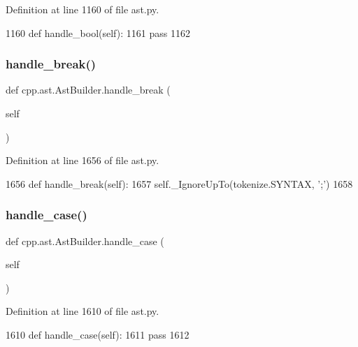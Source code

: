 Definition at line 1160 of file ast.\+py.


\begin{DoxyCode}
1160     \textcolor{keyword}{def }handle\_bool(self):
1161         \textcolor{keywordflow}{pass}
1162 
\end{DoxyCode}
\mbox{\label{classcpp_1_1ast_1_1AstBuilder_a2b663a3e15e70b9d85bf17afb2bcf07a}} 
\subsubsection{\texorpdfstring{handle\+\_\+break()}{handle\_break()}}
{\footnotesize\ttfamily def cpp.\+ast.\+Ast\+Builder.\+handle\+\_\+break (\begin{DoxyParamCaption}\item[{}]{self }\end{DoxyParamCaption})}



Definition at line 1656 of file ast.\+py.


\begin{DoxyCode}
1656     \textcolor{keyword}{def }handle\_break(self):
1657         self.\_IgnoreUpTo(tokenize.SYNTAX, \textcolor{stringliteral}{';'})
1658 
\end{DoxyCode}
\mbox{\label{classcpp_1_1ast_1_1AstBuilder_ac4f02e1ba7df670086e4c9dabdb21458}} 
\subsubsection{\texorpdfstring{handle\+\_\+case()}{handle\_case()}}
{\footnotesize\ttfamily def cpp.\+ast.\+Ast\+Builder.\+handle\+\_\+case (\begin{DoxyParamCaption}\item[{}]{self }\end{DoxyParamCaption})}



Definition at line 1610 of file ast.\+py.


\begin{DoxyCode}
1610     \textcolor{keyword}{def }handle\_case(self):
1611         \textcolor{keywordflow}{pass}
1612 
\end{DoxyCode}
\mbox{\label{classcpp_1_1ast_1_1AstBuilder_aa38687383d0f54d26416054cf2141837}} 
